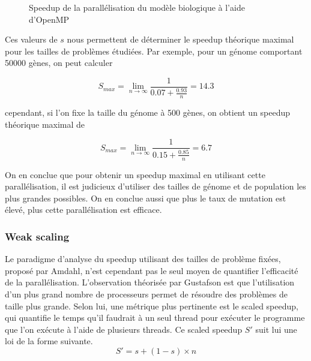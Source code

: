 \documentclass[a4paper, 10pt, twoside]{article}
\begin{document}
\begin{figure}[htb]
\begin{minipage}{0.32\textwidth}
	\end{minipage}
	\caption{Speedup de la parallélisation du modèle biologique à l'aide d'OpenMP}
	\label{fig:speedup/omp}
\end{figure}

Ces valeurs de $s$ nous permettent de déterminer le speedup théorique maximal pour les tailles de problèmes étudiées. Par exemple, pour un génome comportant 50000 gènes, on peut calculer

$$ S_{max} = \lim_{n\to\infty} \frac{1}{0.07 + \frac{0.93}{n}} = 14.3 $$

cependant, si l'on fixe la taille du génome à 500 gènes, on obtient un speedup théorique maximal de

$$ S_{max} = \lim_{n\to\infty} \frac{1}{0.15 + \frac{0.85}{n}} = 6.7 $$

On en conclue que pour obtenir un speedup maximal en utilisant cette parallélisation, il est judicieux d'utiliser des tailles de génome et de population les plus grandes possibles. On en conclue aussi que plus le taux de mutation est élevé, plus cette parallélisation est efficace.

\subsubsection*{Weak scaling}

Le paradigme d'analyse du speedup utilisant des tailles de problème fixées, proposé par Amdahl, n'est cependant pas le seul moyen de quantifier l'efficacité de la parallélisation. L'observation théorisée par Gustafson \cite{gustafson} est que l'utilisation d'un plus grand nombre de processeurs permet de résoudre des problèmes de taille plus grande. Selon lui, une métrique plus pertinente est le scaled speedup, qui quantifie le temps qu'il faudrait à un seul thread pour exécuter le programme que l'on exécute à l'aide de plusieurs threads. Ce scaled speedup $S'$ suit lui une loi de la forme suivante. $$ S' = s + (1 - s) \times n$$
\end{document}
